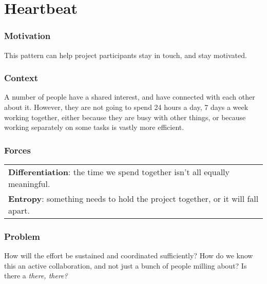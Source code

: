 \section{Heartbeat}\label{sec:Heartbeat}

\subsubsection*{Motivation} This pattern can help project participants stay in touch, and stay motivated.

\subsubsection*{Context}
A number of people have a shared interest, and have connected with each other about it.  However, they are not going to spend 24 hours a day, 7 days a week working together, either because they are busy with other things, or because working separately on some tasks is vastly more efficient.

\subsubsection*{Forces}
\raisebox{-1.5\baselineskip}
{{\centering
\begin{tabular}{p{}}
\textbf{Differentiation}: the time we spend together isn't all equally meaningful.\\
\textbf{Entropy}: something needs to hold the project together, or it will fall apart.\\
\end{tabular}
}}

\subsubsection*{Problem} How will the effort be sustained and coordinated sufficiently?  How do we know this an active collaboration, and not just a bunch of people milling about?  Is there a \emph{there, there?}  


